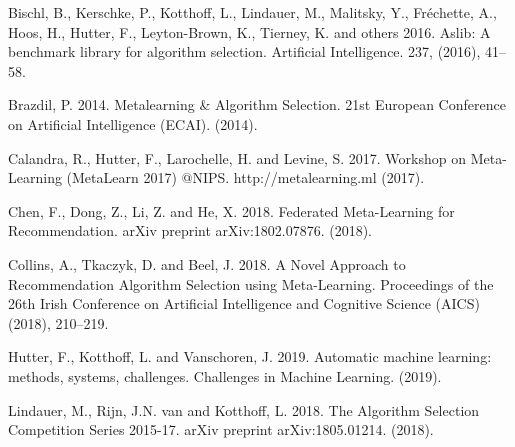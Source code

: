 \documentclass{article}
\begin{document}
\begin{thebibliography}{9}
Bischl, B., Kerschke, P., Kotthoff, L., Lindauer, M., Malitsky, Y., Fréchette, A., Hoos, H., Hutter, F., Leyton-Brown, K., Tierney, K. and others 2016. Aslib: A benchmark library for algorithm selection. Artificial Intelligence. 237, (2016), 41–58.

Brazdil, P. 2014. Metalearning \& Algorithm Selection. 21st European Conference on Artificial Intelligence (ECAI). (2014).

Calandra, R., Hutter, F., Larochelle, H. and Levine, S. 2017. Workshop on Meta-Learning (MetaLearn 2017) @NIPS. http://metalearning.ml (2017).

Chen, F., Dong, Z., Li, Z. and He, X. 2018. Federated Meta-Learning for Recommendation. arXiv preprint arXiv:1802.07876. (2018).

Collins, A., Tkaczyk, D. and Beel, J. 2018. A Novel Approach to Recommendation Algorithm Selection using Meta-Learning. Proceedings of the 26th Irish Conference on Artificial Intelligence and Cognitive Science (AICS) (2018), 210–219.




Hutter, F., Kotthoff, L. and Vanschoren, J. 2019. Automatic machine learning: methods, systems, challenges. Challenges in Machine Learning. (2019).


Lindauer, M., Rijn, J.N. van and Kotthoff, L. 2018. The Algorithm Selection Competition Series 2015-17. arXiv preprint arXiv:1805.01214. (2018).


\end{thebibliography}
\end{document}
